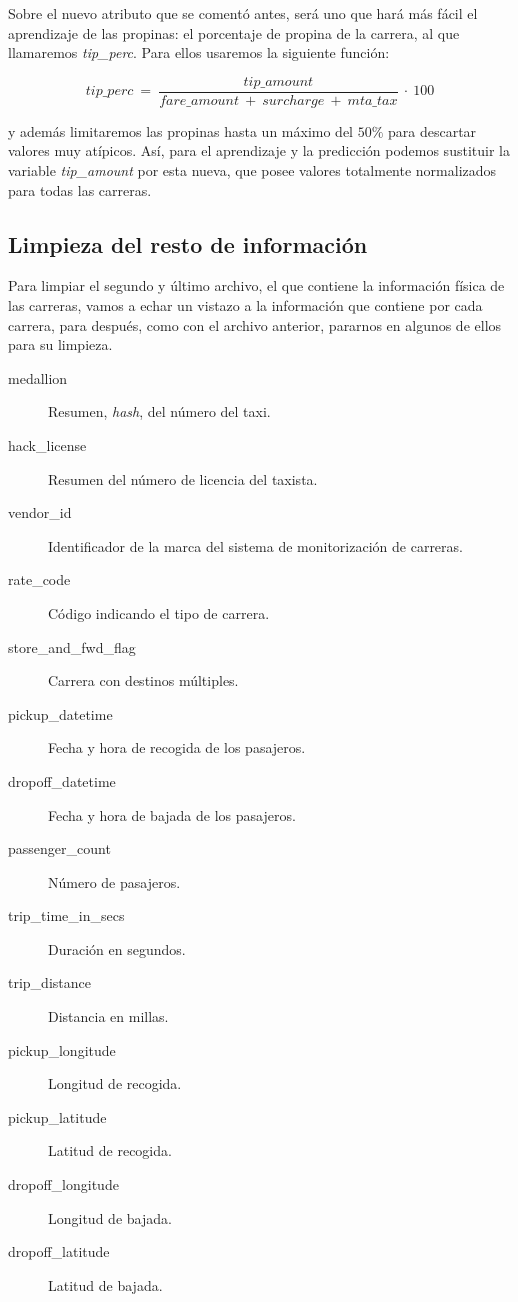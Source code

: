 Sobre el nuevo atributo que se comentó antes, será uno que hará más fácil el aprendizaje de las propinas: el porcentaje de propina de la carrera, al que llamaremos \emph{tip\_perc}. Para ellos usaremos la siguiente función:

$$
tip\_perc\:=\:\frac{tip\_amount}{fare\_amount\:+\:surcharge\:+\:mta\_tax}\:\cdot\:100
$$

\noindent
y además limitaremos las propinas hasta un máximo del $50\%$ para descartar valores muy atípicos. Así, para el aprendizaje y la predicción podemos sustituir la variable \emph{tip\_amount} por esta nueva, que posee valores totalmente normalizados para todas las carreras.

\subsection{Limpieza del resto de información} \label{subsec:5.2.2}

Para limpiar el segundo y último archivo, el que contiene la información física de las carreras, vamos a echar un vistazo a la información que contiene por cada carrera, para después, como con el archivo anterior, pararnos en algunos de ellos para su limpieza.

\begin{description}
\item[medallion] Resumen, \emph{hash}, del número del taxi.

\item[hack\_license] Resumen del número de licencia del taxista.

\item[vendor\_id] Identificador de la marca del sistema de monitorización de carreras.

\item[rate\_code] Código indicando el tipo de carrera.

\item[store\_and\_fwd\_flag] Carrera con destinos múltiples.

\item[pickup\_datetime] Fecha y hora de recogida de los pasajeros.

\item[dropoff\_datetime] Fecha y hora de bajada de los pasajeros.

\item[passenger\_count] Número de pasajeros.

\item[trip\_time\_in\_secs] Duración en segundos.

\item[trip\_distance] Distancia en millas.

\item[pickup\_longitude] Longitud de recogida.

\item[pickup\_latitude] Latitud de recogida.

\item[dropoff\_longitude] Longitud de bajada.

\item[dropoff\_latitude] Latitud de bajada.
\end{description}

